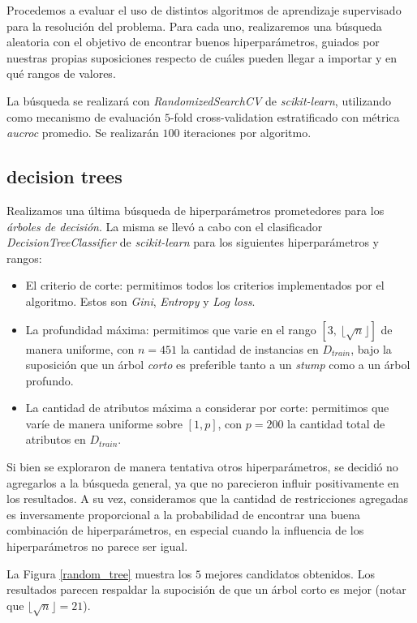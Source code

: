 Procedemos a evaluar el uso de distintos algoritmos de aprendizaje supervisado para la resolución del problema. Para cada uno, realizaremos una búsqueda aleatoria con el objetivo de encontrar buenos hiperparámetros, guiados por nuestras propias suposiciones respecto de cuáles pueden llegar a importar y en qué rangos de valores.

La búsqueda se realizará con \textit{RandomizedSearchCV} de \textit{scikit-learn}, utilizando como mecanismo de evaluación $5$-fold cross-validation estratificado con métrica \textit{aucroc} promedio. Se realizarán $100$ iteraciones por algoritmo.

\subsection{decision trees}
Realizamos una última búsqueda de hiperparámetros prometedores para los \textit{árboles de decisión}. La misma se llevó a cabo con el clasificador \textit{DecisionTreeClassifier} de \textit{scikit-learn} para los siguientes hiperparámetros y rangos: 

\begin{itemize}
    \item El criterio de corte: permitimos todos los criterios implementados por el algoritmo. Estos son \textit{Gini}, \textit{Entropy} y \textit{Log loss}. 
    \item La profundidad máxima: permitimos que varie en el rango $[3,\ \lfloor\sqrt{n} \rfloor]$ de manera uniforme, con $n=451$ la cantidad de instancias en $D_{train}$, bajo la suposición que un árbol \textit{corto} es preferible tanto a un \textit{stump} como a un árbol profundo.
    \item La cantidad de atributos máxima a considerar por corte: permitimos que varíe de manera uniforme sobre $[1, p]$, con $p = 200$ la cantidad total de atributos en $D_{train}$.
\end{itemize}

Si bien se exploraron de manera tentativa otros hiperparámetros, se decidió no agregarlos a la búsqueda general, ya que no parecieron influir positivamente en los resultados. A su vez, consideramos que la cantidad de restricciones agregadas es inversamente proporcional a la probabilidad de encontrar una buena combinación de hiperparámetros, en especial cuando la influencia de los hiperparámetros no parece ser igual. 

La Figura \ref{random_tree} muestra los $5$ mejores candidatos obtenidos. Los resultados parecen respaldar la supocisión de que un árbol corto es mejor (notar que $\lfloor\sqrt{n} \rfloor = 21$).

